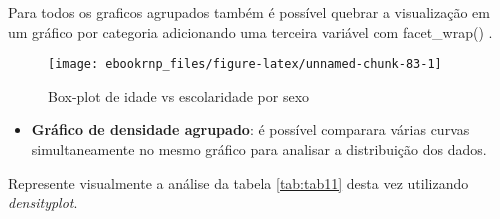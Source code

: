 \documentclass[12pt,]{style/krantz}
\makeatletter
\newenvironment{Shaded}{\begin{snugshade}}{\end{snugshade}}
\newcommand{\KeywordTok}[1]{\textcolor[rgb]{0.13,0.29,0.53}{\textbf{#1}}}
\newcommand{\DataTypeTok}[1]{\textcolor[rgb]{0.13,0.29,0.53}{#1}}
\newcommand{\StringTok}[1]{\textcolor[rgb]{0.31,0.60,0.02}{#1}}
\newcommand{\OtherTok}[1]{\textcolor[rgb]{0.56,0.35,0.01}{#1}}
\newcommand{\OperatorTok}[1]{\textcolor[rgb]{0.81,0.36,0.00}{\textbf{#1}}}
\newcommand{\NormalTok}[1]{#1}
\providecommand{\tightlist}{%
  \setlength{\itemsep}{0pt}\setlength{\parskip}{0pt}}
\renewenvironment{quote}{\begin{VF}}{\end{VF}}
\newenvironment{kframe}{%
\medskip{}
\setlength{\fboxsep}{.8em}
 \def\at@end@of@kframe{}%
 \ifinner\ifhmode%
  \def\at@end@of@kframe{\end{minipage}}%
  \begin{minipage}{\columnwidth}%
 \fi\fi%
 \def\FrameCommand##1{\hskip\@totalleftmargin \hskip-\fboxsep
 \colorbox{shadecolor}{##1}\hskip-\fboxsep
     \hskip-\linewidth \hskip-\@totalleftmargin \hskip\columnwidth}%
 \MakeFramed {\advance\hsize-\width
   \@totalleftmargin\z@ \linewidth\hsize
   \@setminipage}}%
 {\par\unskip\endMakeFramed%
 \at@end@of@kframe}
\renewenvironment{Shaded}{\begin{kframe}}{\end{kframe}}
\theoremstyle{definition}
\theoremstyle{definition}
\theoremstyle{definition}
\theoremstyle{remark}
\let\BeginKnitrBlock\begin \let\EndKnitrBlock\end
\makeatother
\begin{document}
\begin{quote}
Para todos os graficos agrupados também é possível quebrar a
visualização em um gráfico por categoria adicionando uma terceira
variável com facet\_wrap() .
\end{quote}

\begin{Shaded}
\end{Shaded}

\begin{figure}[H]

{\centering \texttt{[image: ebookrnp\_files/figure-latex/unnamed-chunk-83-1]} 

}

\caption{Box-plot de idade vs escolaridade por sexo}\label{fig:unnamed-chunk-83}
\end{figure}

\begin{itemize}
\tightlist
\item
  \textbf{Gráfico de densidade agrupado}: é possível comparara várias
  curvas simultaneamente no mesmo gráfico para analisar a distribuição
  dos dados.
\end{itemize}

\BeginKnitrBlock{example}
\protect\hypertarget{exm:unnamed-chunk-84}{}{\label{exm:unnamed-chunk-84}
}Represente visualmente a análise da tabela \ref{tab:tab11} desta vez
utilizando \emph{densityplot}.
\EndKnitrBlock{example}
\end{document}
